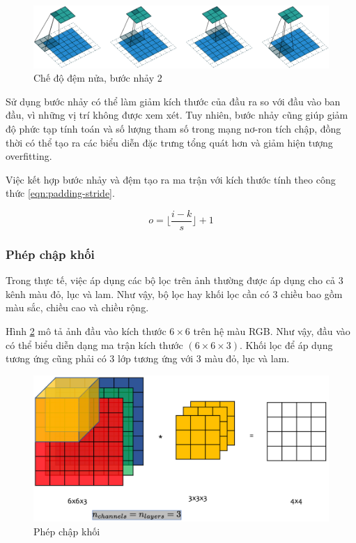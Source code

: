 \begin{figure}[h]
	\centering
	\includegraphics[width=0.9\linewidth]{images/half-padding-stride-2}
	\caption{Chế độ đệm nửa, bước nhảy 2}
	\label{fig:half-padding-stride-2}
\end{figure}

Sử dụng bước nhảy có thể làm giảm kích thước của đầu ra so với đầu vào ban đầu, vì những vị trí không được xem xét. Tuy nhiên, bước nhảy cũng giúp giảm độ phức tạp tính toán và số lượng tham số trong mạng nơ-ron tích chập, đồng thời có thể tạo ra các biểu diễn đặc trưng tổng quát hơn và giảm hiện tượng overfitting.


Việc kết hợp bước nhảy và đệm tạo ra ma trận với kích thước tính theo công thức \ref{eqn:padding-stride}.

\begin{equation}\label{eqn:padding-stride}
	o = \lfloor{\frac{i-k}{s}}\rfloor + 1
\end{equation}

\subsubsection{Phép chập khối}

Trong thực tế, việc áp dụng các bộ lọc trên ảnh thường được áp dụng cho cả 3 kênh màu đỏ, lục và lam. Như vậy, bộ lọc hay khối lọc cần có 3 chiều bao gồm màu sắc, chiều cao và chiều rộng. 

Hình \ref{fig:single-filter-block-conv} mô tả ảnh đầu vào kích thước $6 \times 6$ trên hệ màu RGB. Như vậy, đầu vào có thể biểu diễn dạng ma trận kích thước $(6 \times 6 \times 3)$. Khối lọc để áp dụng tương ứng cũng phải có 3 lớp tương ứng với 3 màu đỏ, lục và lam.

\begin{figure}[h]
	\centering
	\includegraphics[width=0.8\linewidth]{images/single-filter-block-conv}
	\caption{Phép chập khối \cite{dl_ap_2018}}
	\label{fig:single-filter-block-conv}
\end{figure}

